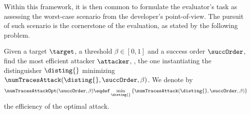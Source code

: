 Within this framework, it is then common to formulate the evaluator's task as assessing the worst-case scenario from the developer's point-of-view.
The pursuit of such scenario is the cornerstone of the evaluation, as stated by the following problem.
\begin{problem}
    \label{final_task}
	Given a target \(\target\), a threshold \(\beta \in [0,1]\) and a success order \(\succOrder\), find the most efficient attacker \(\attacker\), \ie{}, the one instantiating the distinguisher \(\disting{}\) minimizing \(\numTracesAttack(\disting{}, \succOrder, \beta)\).
    We denote by
    \begin{equation}
        \numTracesAttackOpt(\succOrder, \beta) \eqdef \min_{\disting{}} \left\{\numTracesAttack(\disting{}, \succOrder, \beta)\right\}
    \end{equation}
    the efficiency of the optimal attack.
\end{problem}

